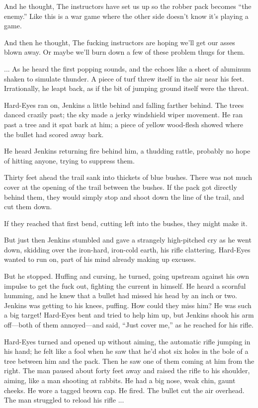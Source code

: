 And he thought, The instructors have set us up so the robber pack becomes ``the enemy.'' Like this is a war game where the other side doesn't know it's playing a game.

And then he thought, The fucking instructors are hoping we'll get our asses blown away. Or maybe we'll burn down a few of these problem thugs for them.

... As he heard the first popping sounds, and the echoes like a sheet of aluminum shaken to simulate thunder. A piece of turf threw itself in the air near his feet. Irrationally, he leapt back, as if the bit of jumping ground itself were the threat.

Hard-Eyes ran on, Jenkins a little behind and falling farther behind. The trees danced crazily past; the sky made a jerky windshield wiper movement. He ran past a tree and it spat bark at him; a piece of yellow wood-flesh showed where the bullet had scored away bark.

He heard Jenkins returning fire behind him, a thudding rattle, probably no hope of hitting anyone, trying to suppress them.

Thirty feet ahead the trail sank into thickets of blue bushes. There was not much cover at the opening of the trail between the bushes. If the pack got directly behind them, they would simply stop and shoot down the line of the trail, and cut them down.

If they reached that first bend, cutting left into the bushes, they might make it.

But just then Jenkins stumbled and gave a strangely high-pitched cry as he went down, skidding over the iron-hard, iron-cold earth, his rifle clattering. Hard-Eyes wanted to run on, part of his mind already making up excuses.

But he stopped. Huffing and cursing, he turned, going upstream against his own impulse to get the fuck out, fighting the current in himself. He heard a scornful humming, and he knew that a bullet had missed his head by an inch or two. Jenkins was getting to his knees, puffing. How could they miss him? He was such a big target! Hard-Eyes bent and tried to help him up, but Jenkins shook his arm off—both of them annoyed—and said, ``Just cover me,'' as he reached for his rifle.

Hard-Eyes turned and opened up without aiming, the automatic rifle jumping in his hand; he felt like a fool when he saw that he'd shot six holes in the bole of a tree between him and the pack. Then he saw one of them coming at him from the right. The man paused about forty feet away and raised the rifle to his shoulder, aiming, like a man shooting at rabbits. He had a big nose, weak chin, gaunt cheeks. He wore a tagged brown cap. He fired. The bullet cut the air overhead. The man struggled to reload his rifle ...

